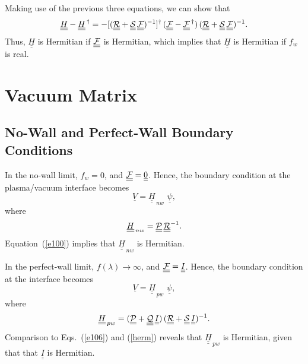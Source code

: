 \documentclass[12pt,prb,aps,notitlepage]{revtex4-1}
\begin{document}
Making use of the previous three equations, we can show that
\begin{equation}\label{herm}
\underline{\underline{H}} -\underline{\underline{H}}^{\,\dag} = 
-[(\underline{\underline{\cal R}}+\underline{\underline{\cal S}}\,\underline{\underline{\cal F}})^{-1}]^{\dag}\,(\underline{\underline{\cal F}}-
\underline{\underline{\cal F}}^{\,\dag})\,(\underline{\underline{\cal R}}+\underline{\underline{\cal S}}\,\underline{\underline{\cal F}})^{-1}.
\end{equation}
Thus, $\underline{\underline{H}}$ is Hermitian if $\underline{\underline{\cal F}}$ is Hermitian, which implies that
$\underline{\underline{H}}$ is Hermitian if $f_w$ is real. 

\section{Vacuum Matrix}
\subsection{No-Wall and Perfect-Wall Boundary Conditions}
In the no-wall limit, $f_w=0$, and $\underline{\underline{\cal F}}=\underline{\underline{0}}$. Hence, the boundary condition at the
plasma/vacuum interface becomes
\begin{equation}
\underline{V}= \underline{\underline{H}}_{\,nw}\,\,\underline{\psi},
\end{equation}
where
\begin{equation}
\underline{\underline{H}}_{\,nw}= \underline{\underline{\cal P}}\,\underline{\underline{\cal R}}^{-1}.
\end{equation}
Equation~(\ref{e100}) implies that $\underline{\underline{H}}_{\,nw}$ is Hermitian. 

In the perfect-wall limit, $f(\lambda)\rightarrow\infty$, and $\underline{\underline{\cal F}}= \underline{\underline{I}}$. 
Hence, the boundary condition at the interface becomes 
\begin{equation}
\underline{V}= \underline{\underline{H}}_{\,pw}\,\,\underline{\psi},
\end{equation}
where
\begin{equation}
\underline{\underline{H}}_{\,pw} = (\underline{\underline{\cal P}}+\underline{\underline{\cal Q}}\,\underline{\underline{I}})\,(\underline{\underline{\cal R}}+\underline{\underline{\cal S}}\,\underline{\underline{I}})^{-1}.
\end{equation}
Comparison to Eqs.~(\ref{e106}) and (\ref{herm}) reveals that $\underline{\underline{H}}_{\,pw}$ is Hermitian, given that that $\underline{\underline{I}}$ is Hermitian.
\end{document}

